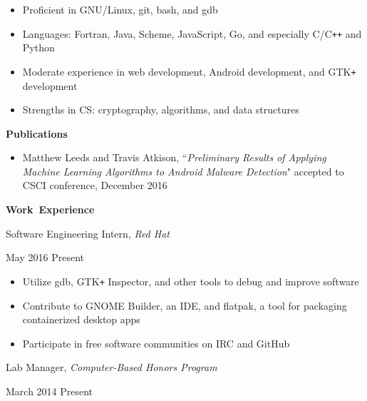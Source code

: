 \documentclass[11pt]{article}
\begin{document}
\begin{itemize}
  \item Proficient in GNU/Linux, git, bash, and gdb
  \item Languages: Fortran, Java, Scheme, JavaScript, Go, and especially C/C\texttt{++} and Python
  \item Moderate experience in web development, Android development, and GTK\texttt{+} development
  \item Strengths in CS: cryptography, algorithms, and data structures
\end{itemize}

\vspace{0.8em}
\hbox{\large \textbf{Publications}}

\vspace{0.4em}
\begin{itemize}[itemindent=0em]
  \item Matthew Leeds and Travis Atkison, ``\textit{Preliminary Results of Applying Machine Learning Algorithms to Android Malware Detection}" accepted to CSCI conference, December 2016
\end{itemize}

\vspace{0.8em}
\hbox{\large \textbf{Work Experience}}

\begin{minipage}[t]{0.65\textwidth}
\flushleft
Software Engineering Intern, \textit{Red Hat}\\
\end{minipage}
\begin{minipage}[t]{0.30\textwidth}
\flushright
May 2016 \space \textemdash \space Present\\
\end{minipage}

\begin{itemize}
  \item Utilize gdb, GTK\texttt{+} Inspector, and other tools to debug and improve software
  \item Contribute to GNOME Builder, an IDE, and flatpak, a tool for packaging containerized desktop apps
  \item Participate in free software communities on IRC and GitHub
\end{itemize}

\begin{minipage}[t]{0.65\textwidth}
\flushleft
Lab Manager, \textit{Computer-Based Honors Program}\\
\end{minipage}
\begin{minipage}[t]{0.30\textwidth}
\flushright
March 2014 \space \textemdash \space Present\\
\end{minipage}
\end{document}
